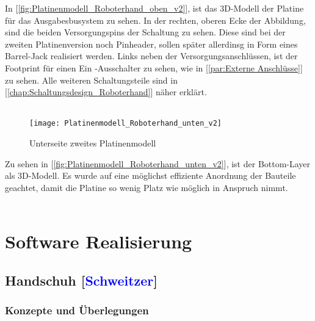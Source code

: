 \documentclass[titlepage,12pt,twoside]{article}
\begin{document}
\hfill \break
In [\textcolor{blue}{\autoref{fig:Platinenmodell_Roboterhand_oben_v2}}], ist das 3D-Modell der Platine für das Ausgabesbusystem zu sehen. In der rechten, oberen
Ecke der Abbildung, sind die beiden Versorgungspins der Schaltung zu sehen. Diese sind bei der zweiten Platinenversion noch Pinheader, sollen
später allerdinsg in Form eines Barrel-Jack realisiert werden. Links neben der Versorgungsanschlüssen, ist der Footprint für einen Ein -Ausschalter
zu sehen, wie in [\textcolor{blue}{\autoref{par:Externe Anschlüsse}}] zu sehen. Alle weiteren Schaltungsteile sind in [\textcolor{blue}{\autoref{chap:Schaltungsdesign_Roboterhand}}] näher
erklärt. \\
\\
\begin{figure}[H]
	\begin{center}
		\scalebox{0.8}
		{\texttt{[image: Platinenmodell\_Roboterhand\_unten\_v2]}}
		\caption{Unterseite zweites Platinenmodell}
		\label{fig:Platinenmodell_Roboterhand_unten_v2}		
	\end{center}
\end{figure}
\hfill \break
Zu sehen in [\textcolor{blue}{\autoref{fig:Platinenmodell_Roboterhand_unten_v2}}], ist der Bottom-Layer als 3D-Modell. Es wurde auf eine möglichst effiziente
Anordnung der Bauteile geachtet, damit die Platine so wenig Platz wie möglich in Anspruch nimmt. \\
\\
\newpage
\section{Software Realisierung}

\subsection{Handschuh [\textcolor{blue}{Schweitzer}]}
\subsubsection{Konzepte und Überlegungen}
\end{document}
